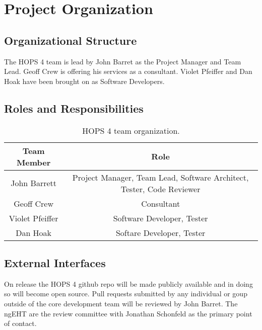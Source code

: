 %
%
\section{Project Organization}
\label{sec:projectorganization}

\subsection{Organizational Structure}
The HOPS 4 team is lead by John Barret as the Project Manager and Team Lead. Geoff Crew is offering his services as a consultant. 
Violet Pfeiffer and Dan Hoak have been brought on as Software Developers. 

\subsection{Roles and Responsibilities}
\begin{table}[h!]
\centering
 \begin{tabular}{c | c} 
 Team Member & Role \\ [0.5ex] 
 \hline%
 John Barrett & Project Manager, Team Lead, Software Architect, Tester, Code Reviewer \\ 
 Geoff Crew & Consultant \\
 Violet Pfeiffer & Software Developer, Tester \\ 
 Dan Hoak & Softare Developer, Tester \\ [1ex]
 \end{tabular}
 \caption{HOPS 4 team organization.}
 \label{table:2}
\end{table}

\subsection{External Interfaces}
On release the HOPS 4 github repo will be made publicly available and in doing so will become open source.
Pull requests submitted by any individual or goup outside of the core development team will be reviewed by John Barret.
The ngEHT are the review committee with Jonathan Schonfeld as the primary point of contact.
%
%
